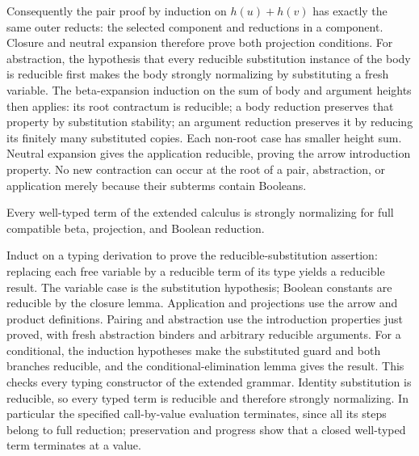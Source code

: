 Consequently the pair proof by induction on $h(u)+h(v)$ has exactly
the same outer reducts: the selected component and reductions in a
component. Closure and neutral expansion therefore prove both
projection conditions. For abstraction, the hypothesis that every
reducible substitution instance of the body is reducible first makes
the body strongly normalizing by substituting a fresh variable.
The beta-expansion induction on the sum of body and argument heights
then applies: its root contractum is reducible; a body reduction
preserves that property by substitution stability; an argument reduction
preserves it by reducing its finitely many substituted copies. Each
non-root case has smaller height sum. Neutral expansion gives the
application reducible, proving the arrow introduction property. No
new contraction can occur at the root of a pair, abstraction, or
application merely because their subterms contain Booleans.

\begin{theorem}
\label{thm:boolean_strong_normalization}
Every well-typed term of the extended calculus is strongly normalizing
for full compatible beta, projection, and Boolean reduction.
\end{theorem}
\Proof
Induct on a typing derivation to prove the reducible-substitution
assertion: replacing each free variable by a reducible term of its
type yields a reducible result. The variable case is the substitution
hypothesis; Boolean constants are reducible by the closure lemma.
Application and projections use the arrow and product definitions.
Pairing and abstraction use the introduction properties just proved,
with fresh abstraction binders and arbitrary reducible arguments.
For a conditional, the induction hypotheses make the substituted
guard and both branches reducible, and the conditional-elimination
lemma gives the result. This checks every typing constructor of the
extended grammar. Identity substitution is reducible, so every typed
term is reducible and therefore strongly normalizing. In particular
the specified call-by-value evaluation terminates, since all its steps
belong to full reduction; preservation and progress show that a closed
well-typed term terminates at a value.
\Done

